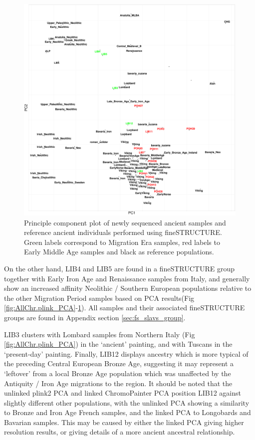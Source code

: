 \begin{figure}[htp]
    \centering
    \includegraphics[width=1.0\textwidth]{../images/chapter5/fs_PCA.pdf}
    \caption{Principle component plot of newly sequenced ancient samples and reference ancient individuals performed using fineSTRUCTURE. Green labels correspond to Migration Era samples, red labels to Early Middle Age samples and black as reference populations.}
    \label{fig:fs_PCA}
\end{figure}

On the other hand, LIB4 and LIB5 are found in a fineSTRUCTURE group together with Early Iron Age and Renaissance samples from Italy, and generally show an increased affinity Neolithic / Southern European populations relative to the other Migration Period samples based on PCA results(Fig \ref{fig:AllChr.plink_PCA}-\ref{fig:fs_PCA}). All samples and their associated fineSTRUCTURE groups are found in Appendix section \ref{sec:fs_slavs_group}. 

LIB3 clusters with Lombard samples from Northern Italy (Fig \ref{fig:AllChr.plink_PCA}) in the `ancient' painting, and with Tuscans in the `present-day' painting. Finally, LIB12 displays ancestry which is more typical of the preceding Central European Bronze Age, suggesting it may represent a `leftover' from a local Bronze Age population which was unaffected by the Antiquity / Iron Age migrations to the region. It should be noted that the unlinked plink2 PCA and linked ChromoPainter PCA position LIB12 against slightly different other populations, with the unlinked PCA showing a similarity to Bronze and Iron Age French samples, and the linked PCA to Longobards and Bavarian samples. This may be caused by either the linked PCA giving higher resolution results, or giving details of a more ancient ancestral relationship.  


